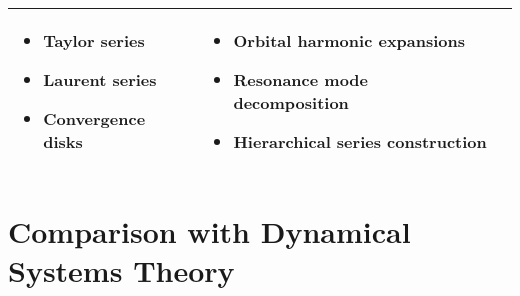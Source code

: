 \begin{center}
\begin{tabular}{|p{3cm}|p{5cm}|p{5cm}|}
\begin{itemize}
    \item Taylor series
    \item Laurent series
    \item Convergence disks
\end{itemize} &
\begin{itemize}
    \item Orbital harmonic expansions
    \item Resonance mode decomposition
    \item Hierarchical series construction
\end{itemize} \\
\hline
\end{tabular}
\label{tab:complex_comparison}
\end{center}

\section{Comparison with Dynamical Systems Theory}

